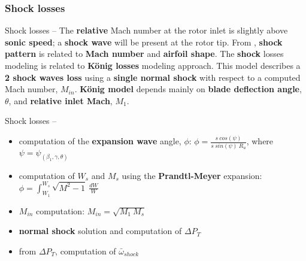 \subsubsection{Shock losses}
	\begin{frame}{Shock losses -- }
		The \textbf{relative} Mach number at the rotor inlet is slightly above \textbf{sonic speed}; a \textbf{shock wave} will be present at the rotor tip. From \cite{manfredi2020transonic}, \textbf{shock pattern} is related to \textbf{Mach number} and \textbf{airfoil shape}.
		\newline
		\newline 
		The \textbf{shock} losses modeling is related to \textbf{K\"onig losses} modeling approach. This model describes a \textbf{2 shock waves loss} using a \textbf{single normal shock} with respect to a computed Mach number, $M_{in}$. 
		\newline
		\newline
		\textbf{K\"onig model} \cite[Sec. 6.7]{axial2004} depends mainly on \textbf{blade deflection angle}, $\theta$, and \textbf{relative inlet Mach}, $M_1$.
	\end{frame}
	\begin{frame}{Shock losses -- }
		\begin{itemize}
			\item computation of the \textbf{expansion wave} angle, $\phi$: $\phi = \frac{s \ cos(\psi)}{s \ sin(\psi) \ R_u}$, where $\psi = \psi_{(\beta_1, \gamma, \theta)}$
			\item computation of $W_s$ and $M_s$ using the \textbf{Prandtl-Meyer} expansion: $\phi = \int_{W_1}^{W_s} \sqrt{M^2 - 1} \ \frac{dW}{W}$
			\item $M_{in}$ computation: $M_{in} = \sqrt{M_1 \ M_s}$
			\item \textbf{normal shock} solution and computation of $\Delta P_T$
			\item from $\Delta P_T$, computation of $\bar{\omega}_{shock}$
		\end{itemize}
	\end{frame}
